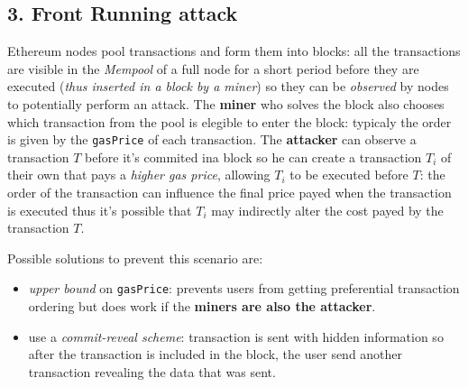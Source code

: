 \documentclass[10pt,a4paper]{report}
\begin{document}
\subsection{3. Front Running attack}\label{sec:3-front-running-attack}
Ethereum nodes pool transactions and form them into blocks: all the transactions are visible in the \textit{Mempool} of a full node for a short period before they are executed (\textit{thus inserted in a block by a miner}) so they can be \textit{observed} by nodes to potentially perform an attack.
The \textbf{miner} who solves the block also chooses which transaction from the pool is elegible to enter the block: typicaly the order is given by the \texttt{gasPrice} of each transaction. The \textbf{attacker} can observe a transaction $T$ before it's commited ina  block so he can create a transaction $T_{i}$ of their own that pays a \textit{higher gas price}, allowing $T_{i}$ to be executed before $T$: the order of the transaction can influence the final price payed when the transaction is executed thus it's possible that $T_{i}$ may indirectly alter the cost payed by the transaction $T$.

Possible solutions to prevent this scenario are:
\begin{itemize}
	\item 
	\textit{upper bound} on \texttt{gasPrice}: prevents users from getting preferential transaction ordering but does work if the \textbf{miners are also the attacker}.
	\item 
	use a \textit{commit-reveal scheme}:  transaction is sent with hidden information so after the transaction is included in the block, the user send another transaction revealing the data that was sent.
\end{itemize}
\end{document}
